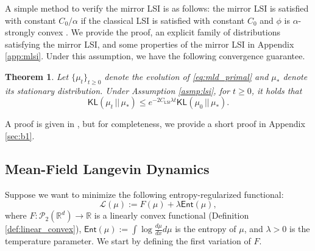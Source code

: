 \documentclass{article}
\newtheorem{theorem}{Theorem}[section]
\newcommand{\CLSI}[0]{C_{\mathsf{LSI}}}
\newcommand{\sep}[0]{\,||\,}
\newcommand{\KL}[0]{\mathsf{KL}}
\begin{document}
A simple method to verify the mirror LSI is as follows: the mirror LSI is satisfied with constant $C_0/\alpha$ if the classical LSI is satisfied with constant $C_0$ and $\phi$ is $\alpha$-strongly convex \citep{Daaloul25}. We provide the proof, an explicit family of distributions satisfying the mirror LSI, and some properties of the mirror LSI in Appendix \ref{app:mlsi}. Under this assumption, we have the following convergence guarantee.
\begin{theorem}\label{thm:mld_convergence}
Let $\{\mu_t\}_{t\ge 0}$ denote the evolution of \eqref{eq:mld_primal} and $\mu_*$ denote its stationary distribution. Under Assumption \ref{asmp:lsi}, for $t\ge 0$, it holds that \[
\KL(\mu_t\sep\mu_*)\le e^{-2\CLSI\lambda t} {\KL(\mu_0\sep\mu_*)}.\]
\end{theorem}
A proof is given in \citet{jiang2021mirror}, but for completeness, we provide a short proof in Appendix \ref{sec:b1}. %


\subsection{Mean-Field Langevin Dynamics}\label{sec:mfld}
Suppose we want to minimize the following entropy-regularized functional: \begin{equation}\label{eq:mfld_L}
\mathcal{L}(\mu) := F(\mu) + \lambda{\mathsf{Ent}}(\mu),
\end{equation}
where $F: \mathcal{P}_2(\mathbb{R}^d)\to\mathbb{R}$ is a linearly convex functional (Definition \ref{def:linear_convex}), $\mathsf{Ent}(\mu):= \int \log\frac{d\mu}{dx}d\mu$ is the entropy of $\mu$, and $\lambda>0$ is the temperature parameter. We start by defining the first variation of $F$.
\end{document}
